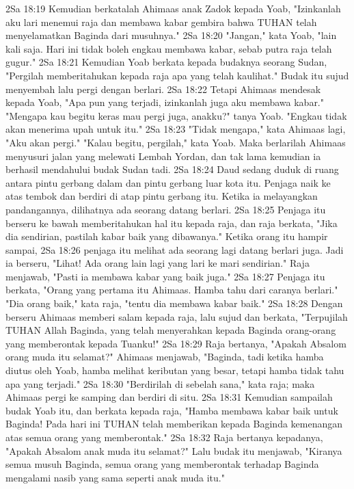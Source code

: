 2Sa 18:19  Kemudian berkatalah Ahimaas anak Zadok kepada Yoab, "Izinkanlah aku lari menemui raja dan membawa kabar gembira bahwa TUHAN telah menyelamatkan Baginda dari musuhnya."
2Sa 18:20  "Jangan," kata Yoab, "lain kali saja. Hari ini tidak boleh engkau membawa kabar, sebab putra raja telah gugur."
2Sa 18:21  Kemudian Yoab berkata kepada budaknya seorang Sudan, "Pergilah memberitahukan kepada raja apa yang telah kaulihat." Budak itu sujud menyembah lalu pergi dengan berlari.
2Sa 18:22  Tetapi Ahimaas mendesak kepada Yoab, "Apa pun yang terjadi, izinkanlah juga aku membawa kabar." "Mengapa kau begitu keras mau pergi juga, anakku?" tanya Yoab. "Engkau tidak akan menerima upah untuk itu."
2Sa 18:23  "Tidak mengapa," kata Ahimaas lagi, "Aku akan pergi." "Kalau begitu, pergilah," kata Yoab. Maka berlarilah Ahimaas menyusuri jalan yang melewati Lembah Yordan, dan tak lama kemudian ia berhasil mendahului budak Sudan tadi.
2Sa 18:24  Daud sedang duduk di ruang antara pintu gerbang dalam dan pintu gerbang luar kota itu. Penjaga naik ke atas tembok dan berdiri di atap pintu gerbang itu. Ketika ia melayangkan pandangannya, dilihatnya ada seorang datang berlari.
2Sa 18:25  Penjaga itu berseru ke bawah memberitahukan hal itu kepada raja, dan raja berkata, "Jika dia sendirian, pastilah kabar baik yang dibawanya." Ketika orang itu hampir sampai,
2Sa 18:26  penjaga itu melihat ada seorang lagi datang berlari juga. Jadi ia berseru, "Lihat! Ada orang lain lagi yang lari ke mari sendirian." Raja menjawab, "Pasti ia membawa kabar yang baik juga."
2Sa 18:27  Penjaga itu berkata, "Orang yang pertama itu Ahimaas. Hamba tahu dari caranya berlari." "Dia orang baik," kata raja, "tentu dia membawa kabar baik."
2Sa 18:28  Dengan berseru Ahimaas memberi salam kepada raja, lalu sujud dan berkata, "Terpujilah TUHAN Allah Baginda, yang telah menyerahkan kepada Baginda orang-orang yang memberontak kepada Tuanku!"
2Sa 18:29  Raja bertanya, "Apakah Absalom orang muda itu selamat?" Ahimaas menjawab, "Baginda, tadi ketika hamba diutus oleh Yoab, hamba melihat keributan yang besar, tetapi hamba tidak tahu apa yang terjadi."
2Sa 18:30  "Berdirilah di sebelah sana," kata raja; maka Ahimaas pergi ke samping dan berdiri di situ.
2Sa 18:31  Kemudian sampailah budak Yoab itu, dan berkata kepada raja, "Hamba membawa kabar baik untuk Baginda! Pada hari ini TUHAN telah memberikan kepada Baginda kemenangan atas semua orang yang memberontak."
2Sa 18:32  Raja bertanya kepadanya, "Apakah Absalom anak muda itu selamat?" Lalu budak itu menjawab, "Kiranya semua musuh Baginda, semua orang yang memberontak terhadap Baginda mengalami nasib yang sama seperti anak muda itu."
